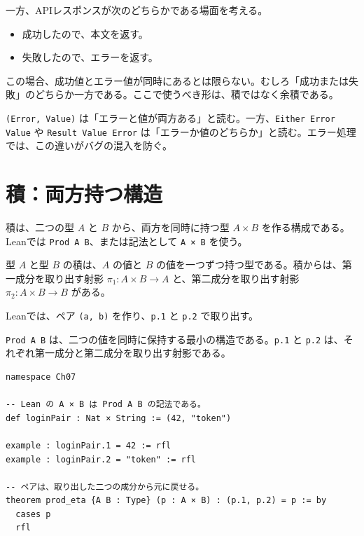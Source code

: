 一方、APIレスポンスが次のどちらかである場面を考える。

\begin{itemize}
\item 成功したので、本文を返す。
\item 失敗したので、エラーを返す。
\end{itemize}

この場合、成功値とエラー値が同時にあるとは限らない。むしろ「成功または失敗」のどちらか一方である。ここで使うべき形は、積ではなく余積である。

\begin{softwarebox}
\texttt{(Error, Value)} は「エラーと値が両方ある」と読む。一方、\texttt{Either Error Value} や \texttt{Result Value Error} は「エラーか値のどちらか」と読む。エラー処理では、この違いがバグの混入を防ぐ。
\end{softwarebox}

\section{積：両方持つ構造}
\label{sec:ch07-product}

積は、二つの型 \(A\) と \(B\) から、両方を同時に持つ型 \(A \times B\) を作る構成である。Leanでは \texttt{Prod A B}、または記法として \texttt{A × B} を使う。

\begin{definitionbox}
型 \(A\) と型 \(B\) の積は、\(A\) の値と \(B\) の値を一つずつ持つ型である。積からは、第一成分を取り出す射影 \(\pi_1 : A \times B \to A\) と、第二成分を取り出す射影 \(\pi_2 : A \times B \to B\) がある。
\end{definitionbox}

Leanでは、ペア \texttt{(a, b)} を作り、\texttt{p.1} と \texttt{p.2} で取り出す。

\begin{leanbox}
\texttt{Prod A B} は、二つの値を同時に保持する最小の構造である。\texttt{p.1} と \texttt{p.2} は、それぞれ第一成分と第二成分を取り出す射影である。
\end{leanbox}

\begin{listing}[htbp]
\begin{verbatim}
namespace Ch07

-- Lean の A × B は Prod A B の記法である。
def loginPair : Nat × String := (42, "token")

example : loginPair.1 = 42 := rfl
example : loginPair.2 = "token" := rfl

-- ペアは、取り出した二つの成分から元に戻せる。
theorem prod_eta {A B : Type} (p : A × B) : (p.1, p.2) = p := by
  cases p
  rfl
\end{verbatim}
\caption{Prodの基本操作}
\label{lst:ch07_prod_basic}
\end{listing}

